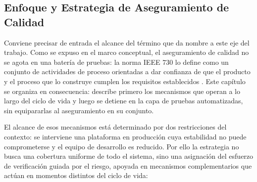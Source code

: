 \subsection{Enfoque y Estrategia de Aseguramiento de Calidad}\label{subsec:enfoque-pruebas}

Conviene precisar de entrada el alcance del término que da nombre a este eje del trabajo. Como se expuso en el marco conceptual, el aseguramiento de calidad no se agota en una batería de pruebas: la norma IEEE 730 lo define como un conjunto de actividades de proceso orientadas a dar confianza de que el producto y el proceso que lo construye cumplen los requisitos establecidos \cite{IEEE730}. Este capítulo se organiza en consecuencia: describe primero los mecanismos que operan a lo largo del ciclo de vida y luego se detiene en la capa de pruebas automatizadas, sin equipararlas al aseguramiento en su conjunto.

El alcance de esos mecanismos está determinado por dos restricciones del contexto: se interviene una plataforma en producción cuya estabilidad no puede comprometerse y el equipo de desarrollo es reducido. Por ello la estrategia no busca una cobertura uniforme de todo el sistema, sino una asignación del esfuerzo de verificación guiada por el riesgo, apoyada en mecanismos complementarios que actúan en momentos distintos del ciclo de vida:

